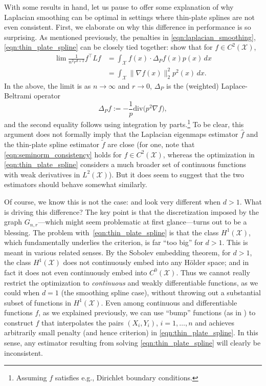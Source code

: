 \documentclass[twoside]{article}
\newcommand{\1}{\mathbf{1}}
\newcommand{\Xset}{\mathcal{X}}
\newcommand{\Leb}{L}
\newcommand{\dive}{\mathrm{div}}
\newcommand{\wt}[1]{\widetilde{#1}}
\newcommand{\wh}[1]{\widehat{#1}}
\theoremstyle{definition}
\theoremstyle{remark}
\begin{document}
With some results in hand, let us pause to offer some explanation of why Laplacian smoothing can be optimal in settings where thin-plate splines are not even consistent. First, we elaborate on why this difference in performance is so surprising. As mentioned previously, the penalties in \eqref{eqn:laplacian_smoothing}, \eqref{eqn:thin_plate_spline} can be closely tied together: \citet{bousquet03} show that for $f \in C^2(\Xset)$, 
\begin{equation}
\label{eqn:seminorm_consistency}
\begin{aligned}
\lim \frac{1}{n^2 r^{d + 2}} f^\top L f & = \int_{\Xset} f(x) \cdot \Delta_Pf(x) p(x) \,dx \\
& = \int_{\Xset} \|\nabla f(x)\|_2^2 p^2(x) \,dx.
\end{aligned}
\end{equation}
In the above, the limit is as $n \to \infty$ and $r \to 0$, $\Delta_P$ is the (weighted) Laplace-Beltrami operator
\begin{equation*}
\Delta_Pf := -\frac{1}{p} \dive\bigl(p^2\nabla f),
\end{equation*}
and the second equality follows using integration by parts.\footnote{Assuming $f$ satisfies e.g., Dirichlet boundary conditions.} To be clear, this argument does not formally imply that the Laplacian eigenmaps estimator $\wh{f}$ and the thin-plate spline estimator $\wt{f}$ are close (for one, note that \eqref{eqn:seminorm_consistency} holds for $f \in C^2(\Xset)$, whereas the optimization in \eqref{eqn:thin_plate_spline} considers a much broader set of continuous functions with weak derivatives in $\Leb^2(\Xset)$). But it does seem to suggest that the two estimators should behave somewhat similarly. 

Of course, we know this is not the case: \smash{$\wh{f}$} and \smash{$\wt{f}$} look very different when $d > 1$. What is driving this difference? The key point is that the discretization imposed by the graph $G_{n,r}$---which might seem problematic at first glance---turns out to be a blessing. The problem with~\eqref{eqn:thin_plate_spline} is that the class $H^1(\Xset)$, which fundamentally underlies the criterion, is far ``too big'' for $d > 1$. This is meant in various related senses. By the Sobolev embedding theorem, for $d>1$, the class $H^1(\Xset)$ does not continuously embed into any H\"{o}lder space; and in fact it does not even continuously embed into $C^0(\Xset)$. Thus we cannot really restrict the optimization to \emph{continuous} and weakly differentiable functions, as we could when $d=1$ (the smoothing spline case), without throwing out a substantial subset of functions in $H^1(\Xset)$. Even among continuous and differentiable functions $f$, as we explained previously, we can use ``bump'' functions (as in \citet{green93}) to construct $f$ that interpolates the pairs $(X_i,Y_i)$, $i=1,\ldots,n$ and achieves arbitrarily small penalty (and hence criterion) in \eqref{eqn:thin_plate_spline}. In this sense, any estimator resulting from solving \eqref{eqn:thin_plate_spline} will clearly be inconsistent. 
\end{document}
